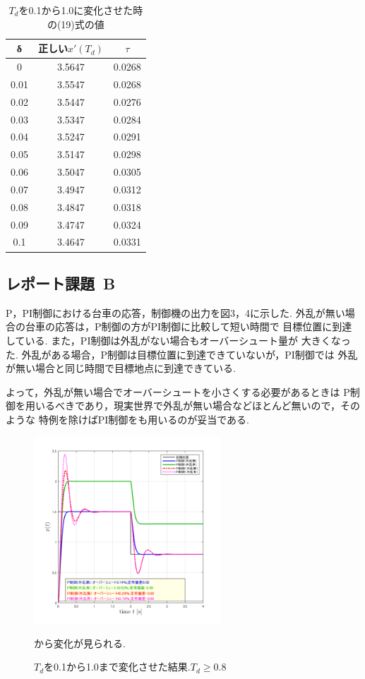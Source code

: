 \documentclass[twocolumn, 10pt,a4j]{jsarticle}
\begin{document}
    \begin{table}
      \begin{center}
        \caption{$T_{d}$を0.1から1.0に変化させた時の(19)式の値}
        \begin{tabular}{|c|c|c|} \hline
          \footnotesize
          δ	& 正しい$x'(T_{d})$ & $\tau$ \\ \hline
          0 & 3.5647 & 0.0268 \\
          0.01 & 3.5547 & 0.0268 \\
          0.02 & 3.5447 & 0.0276 \\
          0.03 & 3.5347 & 0.0284 \\
          0.04 & 3.5247 & 0.0291 \\
          0.05 & 3.5147 & 0.0298 \\
          0.06 & 3.5047 & 0.0305 \\
          0.07 & 3.4947 & 0.0312 \\
          0.08 & 3.4847 & 0.0318 \\
          0.09 & 3.4747 & 0.0324 \\
          0.1 & 3.4647 & 0.0331 \\ \hline
        \end{tabular}
      \end{center}
    \end{table}

  \subsection{レポート課題~B}
  P，PI制御における台車の応答，制御機の出力を図3，4に示した.
  外乱が無い場合の台車の応答は，P制御の方がPI制御に比較して短い時間で
  目標位置に到達している. また，PI制御は外乱がない場合もオーバーシュート量が
  大きくなった. 外乱がある場合，P制御は目標位置に到達できていないが，PI制御では
  外乱が無い場合と同じ時間で目標地点に到達できている. 
  \par よって，外乱が無い場合でオーバーシュートを小さくする必要があるときは
  P制御を用いるべきであり，現実世界で外乱が無い場合などほとんど無いので，そのような
  特例を除けばPI制御をも用いるのが妥当である.


  \begin{figure}[H]
    \centering
    \includegraphics[width=7cm]{../img/B-1.png}
    \caption{$T_{d}$を0.1から1.0まで変化させた結果.$T_{d} \geq 0.8$}から変化が見られる.
  \end{figure}
\end{document}
